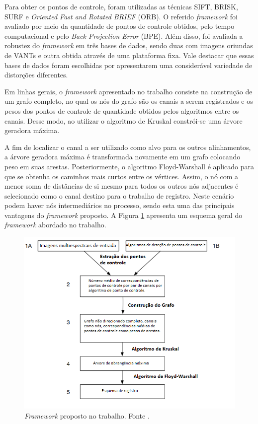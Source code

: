 \documentclass[12pt]{article}
\begin{document}
Para obter os pontos de controle, foram utilizadas as técnicas SIFT, BRISK, SURF e \textit{Oriented Fast and Rotated BRIEF} (ORB). O referido \textit{framework} foi avaliado por meio da quantidade de pontos de controle obtidos, pelo tempo computacional e pelo \textit{Back Projection Error} (BPE). Além disso, foi avaliada a robustez do \textit{framework} em três bases de dados, sendo duas com imagens oriundas de VANTs e outra obtida através de uma plataforma fixa. Vale destacar que essas bases de dados foram escolhidas por apresentarem uma considerável variedade de distorções diferentes.

Em linhas gerais, o \textit{framework} apresentado no trabalho consiste na construção de um grafo completo, no qual os nós do grafo são os canais a serem registrados e os pesos dos pontos de controle de quantidade obtidos pelos algoritmos entre os canais. Desse modo, ao utilizar o algoritmo de Kruskal constrói-se uma árvore geradora máxima. 

A fim de localizar o canal a ser utilizado como alvo para os outros alinhamentos, a árvore geradora máxima é transformada novamente em um grafo colocando peso em suas arestas. Posteriormente, o algoritmo Floyd-Warshall é aplicado para que se obtenha os caminhos mais curtos entre os vértices. Assim, o nó com a menor soma de distâncias de si mesmo para todos os outros nós adjacentes é selecionado como o canal destino para o trabalho de registro. Neste cenário podem haver nós intermediários no processo, sendo esta uma das principais vantagens do \textit{framework} proposto. A Figura \ref{fig:framework} apresenta um esquema geral do \textit{framework} abordado no trabalho.

\begin{figure}[!ht]
    \centering
    \includegraphics[width=0.6\textheight]{figures/framework_novo.png}
    \caption{\textit{Framework} proposto no trabalho. Fonte \cite{yasir2018data}.}
    \label{fig:framework}
\end{figure}
\end{document}
